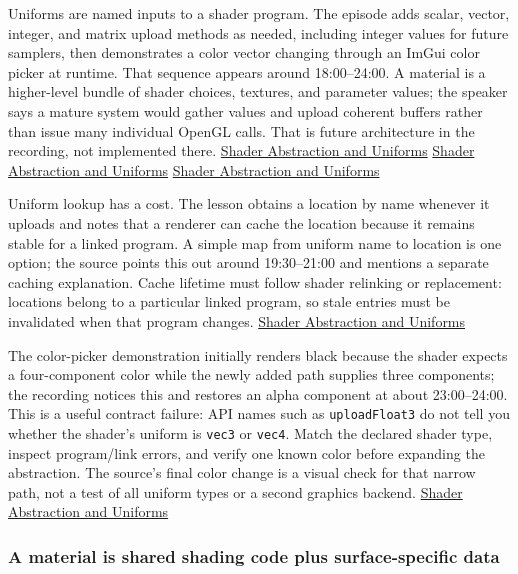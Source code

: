 Uniforms are named inputs to a shader program. The episode adds scalar, vector, integer, and matrix upload methods as needed, including integer values for future samplers, then demonstrates a color vector changing through an ImGui color picker at runtime. That sequence appears around 18:00--24:00. A material is a higher-level bundle of shader choices, textures, and parameter values; the speaker says a mature system would gather values and upload coherent buffers rather than issue many individual OpenGL calls. That is future architecture in the recording, not implemented there. \href{https://www.youtube.com/watch?v=d5wL6eZnWMU&t=1080s}{Shader Abstraction and Uniforms} \href{https://www.youtube.com/watch?v=d5wL6eZnWMU&t=1350s}{Shader Abstraction and Uniforms} \href{https://www.youtube.com/watch?v=d5wL6eZnWMU&t=1430s}{Shader Abstraction and Uniforms}

Uniform lookup has a cost. The lesson obtains a location by name whenever it uploads and notes that a renderer can cache the location because it remains stable for a linked program. A simple map from uniform name to location is one option; the source points this out around 19:30--21:00 and mentions a separate caching explanation. Cache lifetime must follow shader relinking or replacement: locations belong to a particular linked program, so stale entries must be invalidated when that program changes. \href{https://www.youtube.com/watch?v=d5wL6eZnWMU&t=1170s}{Shader Abstraction and Uniforms}

The color-picker demonstration initially renders black because the shader expects a four-component color while the newly added path supplies three components; the recording notices this and restores an alpha component at about 23:00--24:00. This is a useful contract failure: API names such as \texttt{uploadFloat3} do not tell you whether the shader's uniform is \texttt{vec3} or \texttt{vec4}. Match the declared shader type, inspect program/link errors, and verify one known color before expanding the abstraction. The source's final color change is a visual check for that narrow path, not a test of all uniform types or a second graphics backend. \href{https://www.youtube.com/watch?v=d5wL6eZnWMU&t=1380s}{Shader Abstraction and Uniforms}

\subsubsection{A material is shared shading code plus surface-specific data}\label{a-material-is-shared-shading-code-plus-surface-specific-data}

